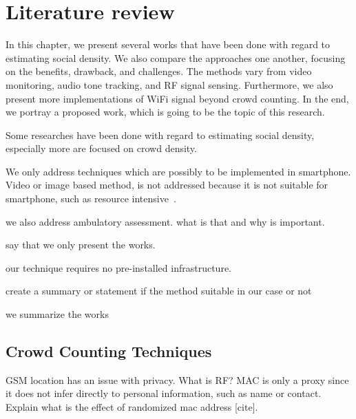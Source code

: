 \chapter{Literature review}\label{ch:literature-review}


In this chapter, we present several works that have been done with regard to estimating social density. We also compare the approaches one another, focusing on the benefits, drawback, and challenges. The methods vary from video monitoring, audio tone tracking, and \ac{RF} signal sensing. Furthermore, we also present more implementations of WiFi signal beyond crowd counting. In the end, we portray a proposed work, which is going to be the topic of this research.

Some researches have been done with regard to estimating social density, especially more are focused on crowd density.

We only address techniques which are possibly to be implemented in smartphone. Video or image based method, is not addressed because it is not suitable for smartphone, such as resource intensive~\cite{thesis034,thesis055}.

we also address ambulatory assessment. what is that and why is important.

say that we only present the works.

our technique requires no pre-installed infrastructure.

create a summary or statement if the method suitable in our case or not

we summarize the works

\section{Crowd Counting Techniques} %
\label{sec:crowd_counting_techniques}
GSM location has an issue with privacy\cite{thesis017}.
What is RF?
MAC is only a proxy since it does not infer directly to personal information, such as name or contact.
Explain what is the effect of randomized mac address [cite].

